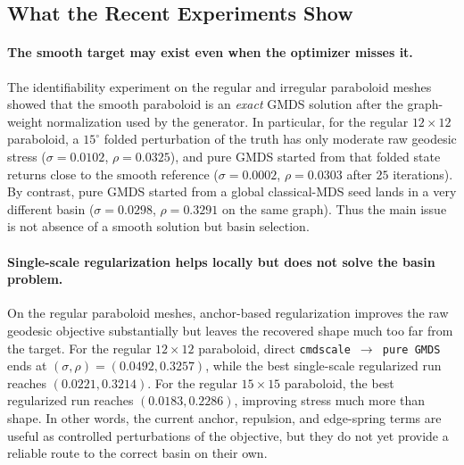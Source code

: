 \documentclass[11pt]{article}
\theoremstyle{definition}
\theoremstyle{plain}
\theoremstyle{remark}
\begin{document}
\subsection{What the Recent Experiments Show}
\label{sec:recent_experiments}

\paragraph{The smooth target may exist even when the optimizer misses it.}
The identifiability experiment on the regular and irregular paraboloid meshes
showed that the smooth paraboloid is an \emph{exact} GMDS solution after the
graph-weight normalization used by the generator.  In particular, for the
regular $12\times 12$ paraboloid, a $15^\circ$ folded perturbation of the
truth has only moderate raw geodesic stress
($\sigma = 0.0102$, $\rho = 0.0325$), and pure GMDS started from that folded
state returns close to the smooth reference
($\sigma = 0.0002$, $\rho = 0.0303$ after $25$ iterations).  By contrast,
pure GMDS started from a global classical-MDS seed lands in a very different
basin ($\sigma = 0.0298$, $\rho = 0.3291$ on the same graph).  Thus the main
issue is not absence of a smooth solution but basin selection.

\paragraph{Single-scale regularization helps locally but does not solve the
basin problem.}
On the regular paraboloid meshes, anchor-based regularization improves the raw
geodesic objective substantially but leaves the recovered shape much too far
from the target.  For the regular $12\times 12$ paraboloid, direct
\texttt{cmdscale $\rightarrow$ pure GMDS} ends at
$(\sigma,\rho)=(0.0492, 0.3257)$, while the best single-scale regularized run
reaches $(0.0221, 0.3214)$.  For the regular $15\times 15$ paraboloid, the
best regularized run reaches $(0.0183, 0.2286)$, improving stress much more
than shape.  In other words, the current anchor, repulsion, and edge-spring
terms are useful as controlled perturbations of the objective, but they do not
yet provide a reliable route to the correct basin on their own.
\end{document}
